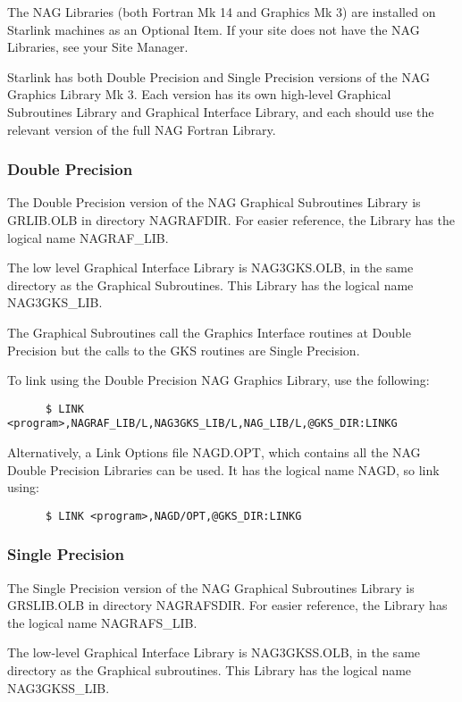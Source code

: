 The NAG Libraries (both Fortran Mk 14 and Graphics Mk 3) are installed on
Starlink machines as an Optional Item. If your site does not have the NAG
Libraries, see your Site Manager.

Starlink has both Double Precision and Single Precision versions of the 
NAG Graphics Library Mk 3. Each version has its own high-level Graphical
Subroutines Library and  Graphical Interface Library, and each should use the 
relevant version of the full NAG Fortran Library.

\subsubsection{Double Precision}

The Double Precision version of the NAG Graphical Subroutines Library is 
GRLIB.OLB in directory NAGRAFDIR. For easier reference, the Library has the 
logical name NAGRAF\_LIB.

The low level Graphical Interface Library is NAG3GKS.OLB, in the same directory
as the Graphical Subroutines. This Library has the logical name NAG3GKS\_LIB.

The Graphical Subroutines call the Graphics Interface routines at Double
Precision but the calls to the GKS routines are Single Precision.   

To link using the Double Precision NAG Graphics Library, use the following:
\begin{verbatim}
      $ LINK <program>,NAGRAF_LIB/L,NAG3GKS_LIB/L,NAG_LIB/L,@GKS_DIR:LINKG
\end{verbatim}
Alternatively, a Link Options file NAGD.OPT, which contains all the NAG Double
Precision Libraries can be used. It has the logical name NAGD, so link using:
\begin{verbatim}
      $ LINK <program>,NAGD/OPT,@GKS_DIR:LINKG
\end{verbatim}

\subsubsection{Single Precision}
The Single Precision version of the NAG Graphical Subroutines Library is 
GRSLIB.OLB in directory NAGRAFSDIR. For easier reference, the Library has the 
logical name NAGRAFS\_LIB.

The low-level Graphical Interface Library is NAG3GKSS.OLB, in the same directory
as the Graphical subroutines. This Library has the logical name NAG3GKSS\_LIB.

